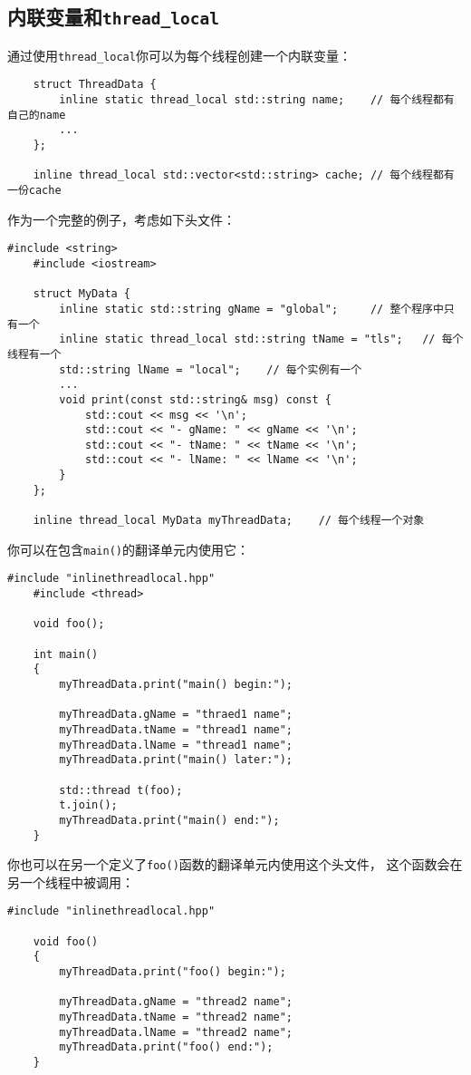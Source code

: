 \subsection{内联变量和\texttt{thread\_local}}
通过使用\texttt{thread\_local}你可以为每个线程创建一个内联变量：
\begin{lstlisting}
    struct ThreadData {
        inline static thread_local std::string name;    // 每个线程都有自己的name
        ...
    };

    inline thread_local std::vector<std::string> cache; // 每个线程都有一份cache
\end{lstlisting}
作为一个完整的例子，考虑如下头文件：
\begin{lstlisting}[frame=single, title=lang/inlinethreadlocal.hpp]
    #include <string>
    #include <iostream>

    struct MyData {
        inline static std::string gName = "global";     // 整个程序中只有一个
        inline static thread_local std::string tName = "tls";   // 每个线程有一个
        std::string lName = "local";    // 每个实例有一个
        ...
        void print(const std::string& msg) const {
            std::cout << msg << '\n';
            std::cout << "- gName: " << gName << '\n';
            std::cout << "- tName: " << tName << '\n';
            std::cout << "- lName: " << lName << '\n';
        }
    };

    inline thread_local MyData myThreadData;    // 每个线程一个对象
\end{lstlisting}
你可以在包含\texttt{main()}的翻译单元内使用它：
\begin{lstlisting}[frame=single, title=lang/inlinethreadlocal1.cpp]
    #include "inlinethreadlocal.hpp"
    #include <thread>

    void foo();

    int main()
    {
        myThreadData.print("main() begin:");

        myThreadData.gName = "thraed1 name";
        myThreadData.tName = "thread1 name";
        myThreadData.lName = "thread1 name";
        myThreadData.print("main() later:");

        std::thread t(foo);
        t.join();
        myThreadData.print("main() end:");
    }
\end{lstlisting}
你也可以在另一个定义了\texttt{foo()}函数的翻译单元内使用这个头文件，
这个函数会在另一个线程中被调用：
\begin{lstlisting}[frame=single, title=lang/inlinethreadlocal2.cpp]
    #include "inlinethreadlocal.hpp"

    void foo()
    {
        myThreadData.print("foo() begin:");

        myThreadData.gName = "thread2 name";
        myThreadData.tName = "thread2 name";
        myThreadData.lName = "thread2 name";
        myThreadData.print("foo() end:");
    }
\end{lstlisting}
